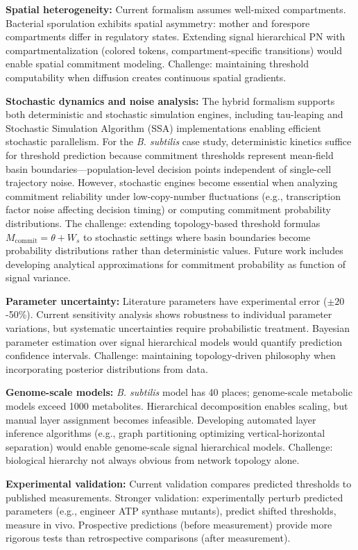 \documentclass[10pt,letterpaper]{article}
\begin{document}
\textbf{Spatial heterogeneity:} Current formalism assumes well-mixed compartments. Bacterial sporulation exhibits spatial asymmetry: mother and forespore compartments differ in regulatory states. Extending signal hierarchical PN with compartmentalization (colored tokens, compartment-specific transitions) would enable spatial commitment modeling. Challenge: maintaining threshold computability when diffusion creates continuous spatial gradients.

\textbf{Stochastic dynamics and noise analysis:} The hybrid formalism supports both deterministic and stochastic simulation engines, including tau-leaping and Stochastic Simulation Algorithm (SSA) implementations enabling efficient stochastic parallelism. For the \textit{B. subtilis} case study, deterministic kinetics suffice for threshold prediction because commitment thresholds represent mean-field basin boundaries---population-level decision points independent of single-cell trajectory noise. However, stochastic engines become essential when analyzing commitment reliability under low-copy-number fluctuations (e.g., transcription factor noise affecting decision timing) or computing commitment probability distributions. The challenge: extending topology-based threshold formulas $M_{\text{commit}} = \theta + W_s$ to stochastic settings where basin boundaries become probability distributions rather than deterministic values. Future work includes developing analytical approximations for commitment probability as function of signal variance.

\textbf{Parameter uncertainty:} Literature parameters have experimental error ($\pm 20$-50\%). Current sensitivity analysis shows robustness to individual parameter variations, but systematic uncertainties require probabilistic treatment. Bayesian parameter estimation over signal hierarchical models would quantify prediction confidence intervals. Challenge: maintaining topology-driven philosophy when incorporating posterior distributions from data.

\textbf{Genome-scale models:} \textit{B. subtilis} model has 40 places; genome-scale metabolic models exceed 1000 metabolites. Hierarchical decomposition enables scaling, but manual layer assignment becomes infeasible. Developing automated layer inference algorithms (e.g., graph partitioning optimizing vertical-horizontal separation) would enable genome-scale signal hierarchical models. Challenge: biological hierarchy not always obvious from network topology alone.

\textbf{Experimental validation:} Current validation compares predicted thresholds to published measurements. Stronger validation: experimentally perturb predicted parameters (e.g., engineer ATP synthase mutants), predict shifted thresholds, measure in vivo. Prospective predictions (before measurement) provide more rigorous tests than retrospective comparisons (after measurement).
\end{document}
